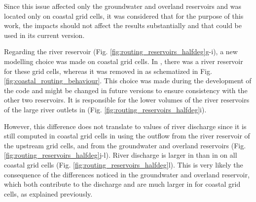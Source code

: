 
Since this issue affected only the groundwater and overland reservoirs and was located only on coastal grid cells, it was considered that for the purpose of this work, the impacts should not affect the results substantially and that \native could be used in its current version.

\hfill

Regarding the river reservoir (Fig. \ref{fig:routing_reservoirs_halfdeg}g-i), a new modelling choice was made on coastal grid cells. In \std, there was a river reservoir for these grid cells, whereas it was removed in \native as schematized in Fig. \ref{fig:coastal_routing_behaviour}. This choice was made during the development of the code and might be changed in future versions to ensure consistency with the other two reservoirs. It is responsible for the lower volumes of the river reservoirs of the large river outlets in \native (Fig. \ref{fig:routing_reservoirs_halfdeg}i).

However, this difference does not translate to values of river discharge since it is still computed in coastal grid cells in \native using the outflow from the river reservoir of the upstream grid cells, and from the groundwater and overland reservoirs (Fig. \ref{fig:routing_reservoirs_halfdeg}j-l). River discharge is larger in \native than in \std on all coastal grid cells (Fig. \ref{fig:routing_reservoirs_halfdeg}l). This is very likely the consequence of the differences noticed in the groundwater and overland reservoir, which both contribute to the discharge and are much larger in \native for coastal grid cells, as explained previously.

